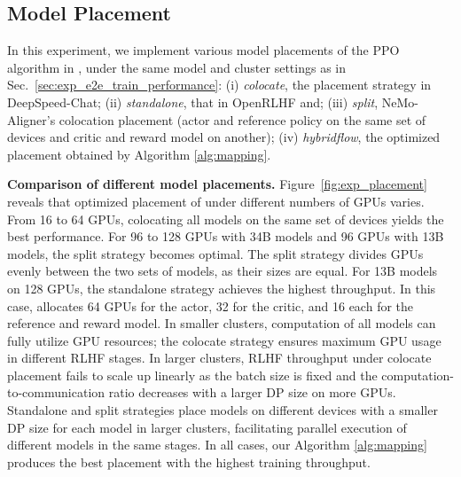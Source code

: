 \vspace{-2mm}
\subsection{Model Placement}%
\label{sec:exp_placement}
In this experiment, we implement various model placements of the PPO algorithm in \sysname{}, under the same model and cluster settings as in Sec.~\ref{sec:exp_e2e_train_performance}: %
(i) \textit{colocate}, the placement strategy in DeepSpeed-Chat; (ii) \textit{standalone}, that in OpenRLHF and; (iii) \textit{split}, NeMo-Aligner's colocation placement (actor and reference policy on the same set of devices and critic and reward model on another); %
(iv) \textit{hybridflow}, %
the optimized placement obtained by Algorithm \ref{alg:mapping}. %


\noindent \textbf{Comparison of different model placements.}  Figure~\ref{fig:exp_placement} reveals that optimized placement of \sysname{} under different numbers of GPUs varies. From 16 to 64 GPUs, colocating all models on the same set of devices yields the best performance. 
For 96 to 128 GPUs with 34B models and 96 GPUs with 13B models, the split strategy becomes optimal. 
The split strategy divides GPUs evenly between the two sets of models, as their sizes are equal.
For 13B models on 128 GPUs, the standalone strategy achieves the highest throughput. %
In this case, \sysname{} allocates 64 GPUs for the actor, 32 for the critic, and 16 each for the reference and reward model.
In smaller clusters, computation of all models can fully utilize GPU resources; the colocate strategy ensures maximum GPU usage in different RLHF stages.
In larger clusters, RLHF throughput under colocate placement fails to scale up linearly as the batch size is fixed and the computation-to-communication ratio decreases with a larger DP size on more GPUs.
Standalone and split strategies place models on different devices with a smaller DP size for each model in larger clusters, facilitating parallel execution of different models in the same stages. %
In all cases, our Algorithm \ref{alg:mapping} produces the best placement with the highest training throughput. 







